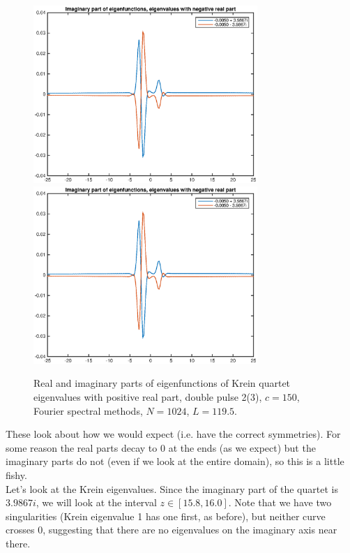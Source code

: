 \documentclass[12pt]{article}
\begin{document}
\begin{figure}[H]
	\includegraphics[width=8.5cm]{1500F_dp2_1195_eignegreal}
	\includegraphics[width=8.5cm]{1500F_dp2_1195_eignegimag}
	\caption{Real and imaginary parts of eigenfunctions of Krein quartet eigenvalues with positive real part, double pulse 2(3), $c = 150$, Fourier spectral methods, $N = 1024$, $L = 119.5$. }
\end{figure}

These look about how we would expect (i.e. have the correct symmetries). For some reason the real parts decay to 0 at the ends (as we expect) but the imaginary parts do not (even if we look at the entire domain), so this is a little fishy.\\

Let's look at the Krein eigenvalues. Since the imaginary part of the quartet is $3.9867i$, we will look at the interval $z \in [15.8, 16.0]$. Note that we have two singularities (Krein eigenvalue 1 has one first, as before), but neither curve crosses 0, suggesting that there are no eigenvalues on the imaginary axis near there.
\end{document}
